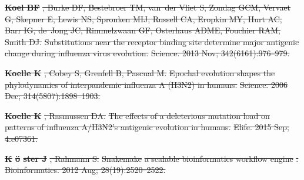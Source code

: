 \documentclass[9pt,lineno]{elife} %
\providecommand{\DIFdel}[1]{{\protect\color{red}\sout{#1}}}                      %
\providecommand{\DIFdeltex}[1]{{\protect\color{red}\sout{#1}}}                      %
\providecommand{\DIFdel}[1]{\texorpdfstring{\DIFdeltex{#1}}{}} %
\begin{document}
\textbf{%
\DIFdel{Koel BF}}%
\DIFdel{, Burke DF, Bestebroer TM, van~der
  Vliet S, Zondag GCM, Vervaet G, Skepner E, Lewis NS, Spronken MIJ, Russell
  CA, Eropkin MY, Hurt AC, Barr IG, de~Jong JC, Rimmelzwaan GF, Osterhaus ADME,
  Fouchier RAM, Smith DJ.
}%
\DIFdel{Substitutions near the receptor binding site determine major
  antigenic change during influenza virus evolution.}%
\DIFdel{Science.  2013 Nov; 342(6161):976--979.
}%

\textbf{%
\DIFdel{Koelle K}}%
\DIFdel{, Cobey S, Grenfell B, Pascual M.
}%
\DIFdel{Epochal evolution shapes the phylodynamics of interpandemic
  influenza A (H3N2) in humans.}%
\DIFdel{Science.  2006 Dec; 314(5807):1898--1903.
}%

\textbf{%
\DIFdel{Koelle K}}%
\DIFdel{, Rasmussen DA.
}%
\DIFdel{The effects of a deleterious mutation load on patterns of influenza
  A/H3N2's antigenic evolution in humans.}%
\DIFdel{Elife.  2015 Sep; 4:e07361.
}%

\textbf{%
\DIFdel{K}%
\DIFdel{\"o}%
\DIFdel{ster J}}%
\DIFdel{, Rahmann S.
}%
\DIFdel{Snakemake}%
\DIFdel{\textemdash}%
\DIFdel{a scalable bioinformatics workflow engine}%
\DIFdel{.
}%
\DIFdel{Bioinformatics.  2012 Aug; 28(19):2520--2522.
}%
\end{document}
